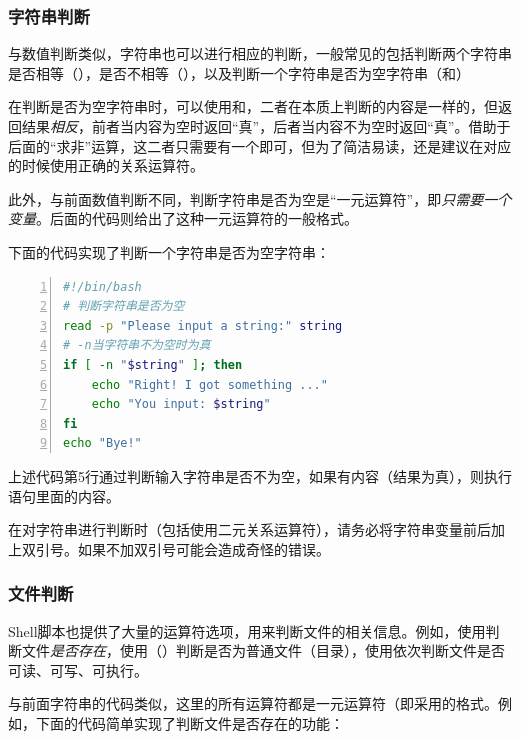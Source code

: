 \subsubsection{字符串判断}

与数值判断类似，字符串也可以进行相应的判断，一般常见的包括判断两个字符串是否相等（\code{==}），是否不相等（\code{!=}），以及判断一个字符串是否为空字符串（和）

\begin{attention}
    在判断是否为空字符串时，可以使用和，二者在本质上判断的内容是一样的，但返回结果\emph{相反}，前者当内容为空时返回“真”，后者当内容不为空时返回“真”。借助于后面的“求非”运算，这二者只需要有一个即可，但为了简洁易读，还是建议在对应的时候使用正确的关系运算符。

    此外，与前面数值判断不同，判断字符串是否为空是“一元运算符”，即\emph{只需要一个变量}。后面的代码则给出了这种一元运算符的一般格式。
\end{attention}

下面的代码实现了判断一个字符串是否为空字符串：

\begin{lstlisting}[language=bash,caption=string\_empty,numbers=left]
#!/bin/bash
# 判断字符串是否为空
read -p "Please input a string:" string
# -n当字符串不为空时为真
if [ -n "$string" ]; then
    echo "Right! I got something ..."
    echo "You input: $string"
fi
echo "Bye!"
\end{lstlisting}

上述代码第5行通过判断输入字符串是否不为空，如果有内容（结果为真），则执行语句里面的内容。

\begin{attention}
    在对字符串进行判断时（包括使用二元关系运算符），请务必将字符串变量前后加上双引号。如果不加双引号可能会造成奇怪的错误。
\end{attention}

\subsubsection{文件判断}

Shell脚本也提供了大量的运算符选项，用来判断文件的相关信息。例如，使用判断文件\emph{是否存在}，使用（）判断是否为普通文件（目录），使用依次判断文件是否可读、可写、可执行。

与前面字符串的代码类似，这里的所有运算符都是一元运算符（即采用的格式。例如，下面的代码简单实现了判断文件是否存在的功能：

